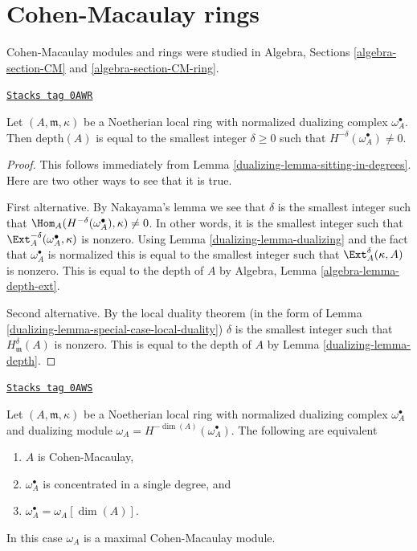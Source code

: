 \section{Cohen-Macaulay rings}
\label{dualizing-section-CM}
Cohen-Macaulay modules and rings were studied in
Algebra, Sections \ref{algebra-section-CM} and \ref{algebra-section-CM-ring}.

\begin{lemma}
\label{dualizing-lemma-depth-in-terms-dualizing-complex}
\href{https://stacks.math.columbia.edu/tag/0AWR}{\texttt{Stacks tag 0AWR}}

Let $(A, \mathfrak m, \kappa)$ be a Noetherian local ring with
normalized dualizing complex $\omega_A^\bullet$.
Then $\text{depth}(A)$ is equal to the smallest integer $\delta \geq 0$
such that $H^{-\delta}(\omega_A^\bullet) \not = 0$.
\end{lemma}

\begin{proof}

This follows immediately from
Lemma \ref{dualizing-lemma-sitting-in-degrees}.
Here are two other ways to see that it is true.

\medskip\noindent
First alternative. By Nakayama's lemma we see that
$\delta$ is the smallest integer such that
$\Hom_A(H^{-\delta}(\omega_A^\bullet), \kappa) \not = 0$.
In other words, it is the smallest integer such that
$\Ext_A^{-\delta}(\omega_A^\bullet, \kappa)$
is nonzero. Using Lemma \ref{dualizing-lemma-dualizing} and the fact that
$\omega_A^\bullet$ is normalized this is equal to the
smallest integer such that $\Ext_A^\delta(\kappa, A)$ is
nonzero. This is equal to the depth of $A$ by
Algebra, Lemma \ref{algebra-lemma-depth-ext}.

\medskip\noindent
Second alternative. By the local duality theorem
(in the form of Lemma \ref{dualizing-lemma-special-case-local-duality})
$\delta$ is the smallest integer such that $H^\delta_\mathfrak m(A)$
is nonzero. This is equal to the depth of $A$ by
Lemma \ref{dualizing-lemma-depth}.
\end{proof}

\begin{lemma}[Apply CM]
\label{dualizing-lemma-apply-CM}
\href{https://stacks.math.columbia.edu/tag/0AWS}{\texttt{Stacks tag 0AWS}}

Let $(A, \mathfrak m, \kappa)$ be a Noetherian local ring
with normalized dualizing complex $\omega_A^\bullet$
and dualizing module $\omega_A = H^{-\dim(A)}(\omega_A^\bullet)$.
The following are equivalent
\begin{enumerate}
\item $A$ is Cohen-Macaulay,
\item $\omega_A^\bullet$ is concentrated in a single degree, and
\item $\omega_A^\bullet = \omega_A[\dim(A)]$.
\end{enumerate}
In this case $\omega_A$ is a maximal Cohen-Macaulay module.
\end{lemma}

